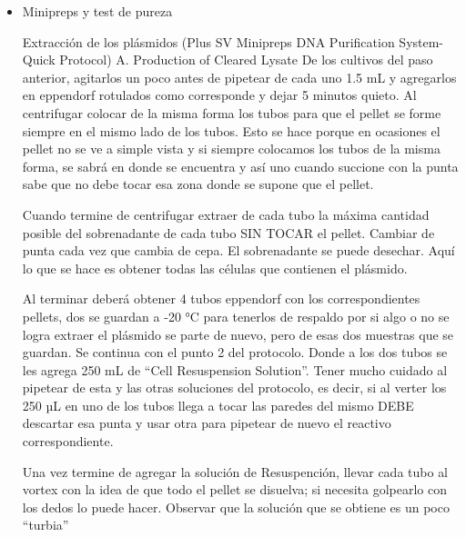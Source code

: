 \begin{appendix}
\begin{itemize}
\item{Minipreps y test de pureza}

Extracción de los plásmidos (Plus SV Minipreps DNA Purification System-Quick Protocol)
    A. Production of Cleared Lysate
De los cultivos del paso anterior, agitarlos un poco antes de pipetear de cada uno 1.5 mL y agregarlos en eppendorf rotulados como corresponde y dejar 5 minutos quieto. Al centrifugar colocar de la misma forma los tubos para que el pellet se forme siempre en el mismo lado de los tubos. Esto se hace porque en ocasiones el pellet no se ve a simple vista y si siempre colocamos los tubos de la misma forma, se sabrá en donde se encuentra y así uno cuando succione con la punta sabe que no debe tocar esa zona donde se supone que el pellet.

Cuando termine de centrifugar extraer de cada tubo la máxima cantidad posible del sobrenadante de cada tubo SIN TOCAR el pellet. Cambiar de punta cada vez que cambia de cepa. El sobrenadante se puede desechar. Aquí lo que se hace es obtener todas las células que contienen el plásmido.

Al terminar deberá obtener 4 tubos eppendorf con los correspondientes pellets, dos se guardan a -20 °C para tenerlos de respaldo por si algo o no se logra extraer el plásmido se parte de nuevo, pero de esas dos muestras que se guardan.
Se continua con el punto 2 del protocolo. Donde a los dos tubos se les agrega 250 mL de “Cell Resuspension Solution”. Tener mucho cuidado al pipetear de esta y las otras soluciones del protocolo, es decir, si al verter los 250 µL en uno de los tubos llega a tocar las paredes del mismo DEBE descartar esa punta y usar otra para pipetear de nuevo el reactivo correspondiente.

Una vez termine de agregar la solución de Resuspención, llevar cada tubo al vortex con la idea de que todo el pellet se disuelva; si necesita golpearlo con los dedos lo puede hacer. Observar que la solución que se obtiene es un poco “turbia” 


\end{itemize}
\end{appendix}
